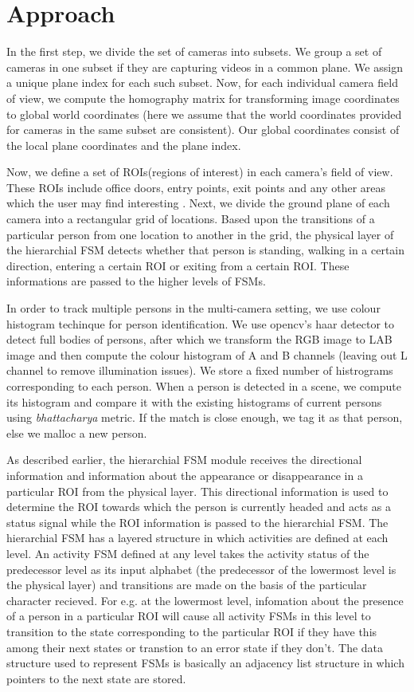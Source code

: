 \documentclass[a4paper]{article}
\begin{document}
\section{Approach}
In the first step, we divide the set of cameras into subsets. We group a set of cameras in one subset if they are capturing videos in a 
common plane. We assign a unique plane index for each such subset. Now, for each individual camera field of view, we compute the 
homography matrix for transforming image coordinates to global world coordinates (here we assume that the world coordinates provided for 
cameras in the same subset are consistent). Our global coordinates consist of the local plane coordinates and the plane index.

Now, we define a set of ROIs(regions of interest) in each camera's field of view. These ROIs include office doors, entry points, exit 
points and any other areas which the user may find interesting \cite{dhruv}. Next, we divide the ground plane of each camera into a 
rectangular grid of locations. Based upon the transitions of a particular person from one location to another in the grid, the physical 
layer of the hierarchial FSM detects whether that person is standing, walking in a certain direction, entering a certain ROI or exiting 
from a certain ROI. These informations are passed to the higher levels of FSMs.

In order to track multiple persons in the multi-camera setting, we use colour histogram techinque for person identification. We use 
opencv's haar detector to detect full bodies of persons, after which we transform the RGB image to LAB image \cite[Sec II.B]{jiang} and 
then compute the colour histogram of A and B channels (leaving out L channel to remove illumination issues). We store a fixed number of 
histrograms corresponding to each person. When a person is detected in a scene, we compute its histogram and compare it with the existing 
histograms of current persons using \emph{bhattacharya} metric. If the match is close enough, we tag it as that person, else we malloc a 
new person.

As described earlier, the hierarchial FSM module receives the directional information and information about the appearance or 
disappearance in a particular ROI from the physical layer. This directional information is used to determine the ROI towards which the 
person is currently headed and acts as a status signal while the ROI information is passed to the hierarchial FSM. The hierarchial FSM has 
a layered structure in which activities are defined at each level. An activity FSM defined at any level takes the activity status of the 
predecessor level as its input alphabet (the predecessor of the lowermost level is the physical layer) and transitions are made on the 
basis of the particular character recieved. For e.g. at the lowermost level, infomation about the presence of a person in a particular ROI 
will cause all activity FSMs in this level to transition to the state corresponding to the particular ROI if they have this among their 
next states or transtion to an error state if they don't. The data structure used to represent FSMs is basically an adjacency list 
structure in which pointers to the next state are stored.
 
\end{document}
